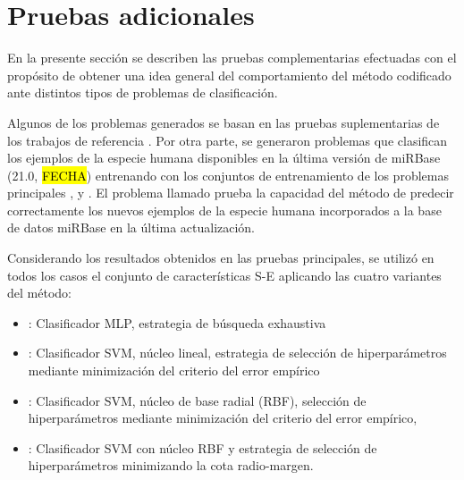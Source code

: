 %
%
%
\section{Pruebas adicionales}
%
En la presente sección se describen las pruebas complementarias
efectuadas con el propósito de obtener una idea general del
comportamiento del método codificado ante distintos tipos de problemas
de clasificación.

Algunos de los problemas generados se basan en las pruebas
suplementarias de los trabajos de referencia \cite{xue,ng}.
Por otra parte, se generaron problemas que clasifican los ejemplos de
la especie humana disponibles en la última versión de miRBase (21.0,
\hl{FECHA}) entrenando con los conjuntos de entrenamiento de los
problemas principales \tripletsvm{}, \mipred{} y \micropred{}.
El problema llamado \deltamirbase{} prueba la capacidad del método de
predecir correctamente los nuevos ejemplos de la especie humana
incorporados a la base de datos miRBase en la última actualización.

Considerando los resultados obtenidos en las pruebas principales, se
utilizó en todos los casos el conjunto de características S-E
aplicando las cuatro variantes del método:
%
\begin{itemize}
\item
  : Clasificador MLP, estrategia de búsqueda
  exhaustiva
\item
  : Clasificador SVM, núcleo lineal, estrategia de
  selección de hiperparámetros mediante minimización del criterio del error
  empírico
\item
  : Clasificador SVM, núcleo de base radial (RBF), selección de
  hiperparámetros mediante minimización del criterio del error empírico,
\item
  : Clasificador SVM con núcleo RBF y estrategia de
  selección de hiperparámetros minimizando la cota radio-margen.
\end{itemize}
%
